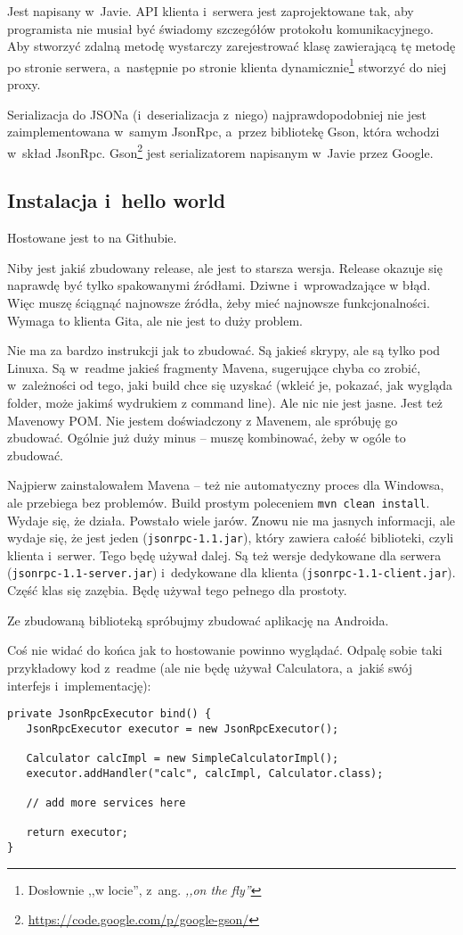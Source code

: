 Jest napisany w~Javie.
API klienta i~serwera jest zaprojektowane tak, aby programista nie musiał być świadomy szczegółów protokołu komunikacyjnego.
Aby stworzyć zdalną metodę wystarczy zarejestrować klasę zawierającą tę metodę po stronie serwera, a~następnie po stronie klienta dynamicznie\footnote{Dosłownie ,,w locie'', z~ang. \emph{,,on the fly''}} stworzyć do niej proxy.

Serializacja do JSONa (i~deserializacja z~niego) najprawdopodobniej nie jest zaimplementowana w~samym JsonRpc, a~przez bibliotekę Gson, która wchodzi w~skład JsonRpc. Gson\footnote{\url{https://code.google.com/p/google-gson/}} jest serializatorem napisanym w~Javie przez Google.
 
\subsection{Instalacja i~hello world}
Hostowane jest to na Githubie.

Niby jest jakiś zbudowany release, ale jest to starsza wersja. Release okazuje się naprawdę być tylko spakowanymi źródłami. Dziwne i~wprowadzające w błąd.
Więc muszę ściągnąć najnowsze źródła, żeby mieć najnowsze funkcjonalności.
Wymaga to klienta Gita, ale nie jest to duży problem. 

Nie ma za bardzo instrukcji jak to zbudować. Są jakieś skrypy, ale są tylko pod Linuxa. Są w~readme jakieś fragmenty Mavena, sugerujące chyba co zrobić, w~zależności od tego, jaki build chce się uzyskać (wkleić je, pokazać, jak wygląda folder, może jakimś wydrukiem z command line). Ale nic nie jest jasne.
Jest też Mavenowy POM. Nie jestem doświadczony z Mavenem, ale spróbuję go zbudować. Ogólnie już duży minus -- muszę kombinować, żeby w ogóle to zbudować.

Najpierw zainstalowałem Mavena -- też nie automatyczny proces dla Windowsa, ale przebiega bez problemów. Build prostym poleceniem \texttt{mvn~clean~install}. Wydaje się, że działa.
Powstało wiele jarów.
Znowu nie ma jasnych informacji, ale wydaje się, że jest jeden (\texttt{jsonrpc-1.1.jar}), który zawiera całość biblioteki, czyli klienta i~serwer. Tego będę używał dalej. Są też wersje dedykowane dla serwera (\texttt{jsonrpc-1.1-server.jar}) i~dedykowane dla klienta (\texttt{jsonrpc-1.1-client.jar}). Część klas się zazębia.
Będę używał tego pełnego dla prostoty.

Ze zbudowaną biblioteką spróbujmy zbudować aplikację na Androida.

Coś nie widać do końca jak to hostowanie powinno wyglądać. Odpalę sobie taki przykładowy kod z~readme (ale nie będę używał Calculatora, a~jakiś swój interfejs i~implementację):
\begin{lstlisting}[frame=single, caption={Przykładowy sposób wystawiania serwera bez użycia serwletów}, label=code:bla]
private JsonRpcExecutor bind() {
   JsonRpcExecutor executor = new JsonRpcExecutor();

   Calculator calcImpl = new SimpleCalculatorImpl();
   executor.addHandler("calc", calcImpl, Calculator.class); 

   // add more services here

   return executor;
}
\end{lstlisting}

